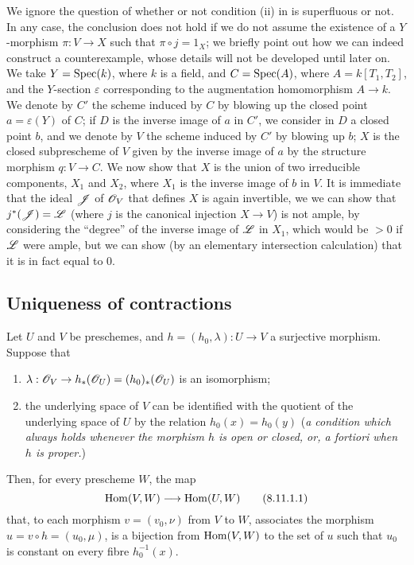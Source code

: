 \begin{remark}[8.10.7]
\label{II.8.10.7}
We ignore the question of whether or not condition (ii) in  is superfluous or not.
In any case, the conclusion does not hold if we do not assume the existence of a $Y$-morphism $\pi:V\to X$ such that $\pi\circ j=1_X$;
we briefly point out how we can indeed construct a counterexample, whose details will not be developed until later on.
We take $Y=\operatorname{Spec}(k)$, where $k$ is a field, and $C=\operatorname{Spec}(A)$, where $A=k[T_1,T_2]$, and the $Y$-section $\varepsilon$ corresponding to the augmentation homomorphism $A\to k$.
We denote by $C'$ the scheme induced by $C$ by blowing up the closed point $a=\varepsilon(Y)$ of $C$;
if $D$ is the inverse image of $a$ in $C'$, we consider in $D$ a closed point $b$,
and we denote by $V$ the scheme induced by $C'$ by blowing up $b$;
$X$ is the closed subprescheme of $V$ given by the inverse image of $a$ by the structure morphism $q:V\to C$.
We now show that $X$ is the union of two irreducible components, $X_1$ and $X_2$, where $X_1$ is the inverse image of $b$ in $V$.
It is immediate that the ideal $\mathscr{J}$ of $\mathscr{O}_V$ that defines $X$ is again invertible, we we can show that $j^*(\mathscr{J})=\mathscr{L}$ (where $j$ is the canonical injection $X\to V$) is not ample, by considering the ``degree'' of the inverse image of $\mathscr{L}$ in $X_1$, which would be $>0$ if $\mathscr{L}$ were ample, but we can show (by an elementary intersection calculation) that it is in fact equal to $0$.
\end{remark}


\subsection{Uniqueness of contractions}
\label{subsection:2.8.11}

\begin{lemma}[8.11.1]
\label{II.8.11.1}
Let $U$ and $V$ be preschemes, and $h=(h_0,\lambda):U\to V$ a surjective morphism.
Suppose that
\begin{enumerate}
    \item $\lambda:\sh{O}_V\to h_*(\sh{O}_U) = (h_0)_*(\sh{O}_U)$ is an isomorphism;
    \item the underlying space of $V$ can be identified with the quotient of the underlying space of $U$ by the relation $h_0(x)=h_0(y)$ (\emph{a condition which always holds whenever the morphism $h$ is \emph{open} or \emph{closed}, or, \emph{a fortiori} when $h$ is \emph{proper}.})
\end{enumerate}
Then, for every prescheme $W$, the map
\[
\label{II.8.11.1.1}
    \Hom(V,W) \to \Hom(U,W)
\tag{8.11.1.1}
\]
that, to each morphism $v=(v_0,\nu)$ from $V$ to $W$, associates the morphism $u=v\circ h=(u_0,\mu)$, is a bijection from $\operatorname{Hom}(V,W)$ to the set of $u$ such that $u_0$ is constant on every fibre $h_0^{-1}(x)$.
\end{lemma}

